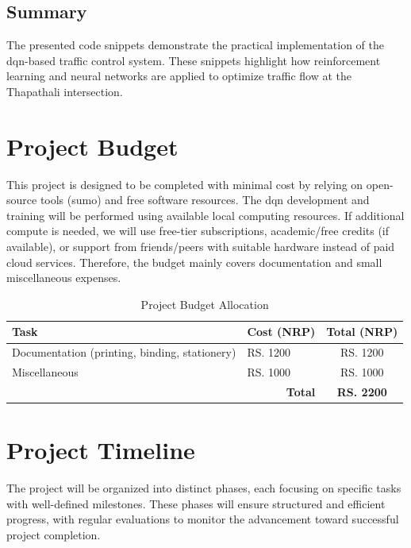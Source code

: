 \section{Summary}
\label{sec:code_summary}
The presented code snippets demonstrate the practical implementation of the \gls{dqn}-based traffic control system. These snippets highlight how reinforcement learning and neural networks are applied to optimize traffic flow at the Thapathali intersection.

\chapter{Project Budget}
\label{chap:project_budget}

This project is designed to be completed with minimal cost by relying on open-source tools (\eg \gls{sumo}) and free software resources. The \gls{dqn} development and training will be performed using available local computing resources. If additional compute is needed, we will use free-tier subscriptions, academic/free credits (if available), or support from friends/peers with suitable hardware instead of paid cloud services. Therefore, the budget mainly covers documentation and small miscellaneous expenses.

\begin{table}[H]
    \centering
    \small
    \caption{Project Budget Allocation}
    \label{tab:budget_allocation}
    \begin{tabular}{p{7cm}p{3cm}c}
        \toprule
        \textbf{Task} & \textbf{Cost (NRP)} & \textbf{Total (NRP)} \\
        \midrule
        Documentation (printing, binding, stationery) & RS. 1200 & RS. 1200 \\
        Miscellaneous & RS. 1000 & RS. 1000 \\
        \midrule
        \multicolumn{2}{r}{\textbf{Total}} & \textbf{RS. 2200} \\
        \bottomrule
    \end{tabular}
\end{table}

\chapter{Project Timeline}
\label{chap:project_timeline}

The project will be organized into distinct phases, each focusing on specific tasks with well-defined milestones. These phases will ensure structured and efficient progress, with regular evaluations to monitor the advancement toward successful project completion.

